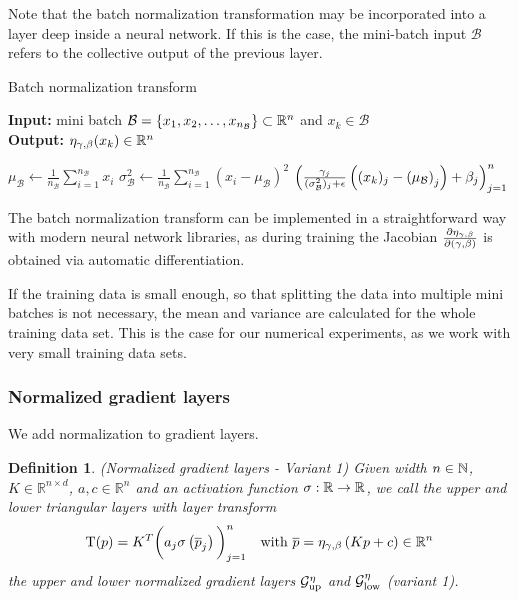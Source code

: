 \documentclass[twoside,a4paper]{article}
\newtheorem{definition}{Definition}
\begin{document}
Note that the batch normalization transformation may be incorporated into a layer
deep inside a neural network. If this is the case, the mini-batch input $\mathcal{B}$ 
refers to the collective output of the previous layer.

\begin{algorithm}\label{algo_batch_norm}
	\caption{Batch normalization transform}
	\textbf{Input:} mini batch $\mathcal{B} = \{x_1, x_2, \dots, x_{n_\mathcal{B}}\} \subset \mathbb{R}^n$ 
	and $x_k \in \mathcal{B}$ \\
	\textbf{Output:} $\eta_{\gamma, \beta}(x_k) \in \mathbb{R}^n$
	\begin{algorithmic}
		 
			\State $\mu_\mathcal{B} \gets \frac{1}{n_\mathcal{B}} \sum_{i=1}^{n_\mathcal{B}} x_i$
			\State $\sigma^2_\mathcal{B} \gets \frac{1}{n_\mathcal{B}} \sum_{i=1}^{n_\mathcal{B}} 
			(x_i - \mu_\mathcal{B})^2$
		\EndIf
		\State \Return 
		$\left( \frac{\gamma_j}{(\sigma^2_\mathcal{B})_j + \epsilon} 
		\left( (x_k)_j - \left( \mu_\mathcal{B} \right)_j \right) + \beta_j \right)_{j=1}^n$
	\end{algorithmic}
\end{algorithm}

The batch normalization transform can be implemented in a straightforward way with modern
neural network libraries, as during training the Jacobian $\frac{\partial \eta_{\gamma, \beta}}{\partial (\gamma, \beta)}$ 
is obtained via automatic differentiation.

If the training data is small enough, so that splitting the data into multiple mini batches
is not necessary, the mean and variance are calculated for the whole training data set. This is the
case for our numerical experiments, as we work with very small training data sets.

\subsubsection{Normalized gradient layers}

We add normalization to gradient layers.

\begin{definition}
	(Normalized gradient layers - Variant 1)
	Given width $n \in \mathbb{N}$, $K \in \mathbb{R}^{n \times d}$, $a,c \in \mathbb{R}^n$ and
	an activation function $\sigma : \mathbb{R} \to \mathbb{R}$,
	we call the upper and lower triangular layers with layer transform
	\begin{equation*}
		\mathrm{T}(p) = K^T \bigg( a_j \sigma
		\left( \overline{p}_j \right) \bigg)_{j=1}^n
		\quad \text{with } \overline{p} = \eta_{\gamma, \beta} \left( Kp + c \right) \in \mathbb{R}^n
	\end{equation*}
	the upper and lower normalized gradient layers 
	$\mathcal{G}_{\text{up}}^{\eta}$ and $\mathcal{G}_{\text{low}}^{\eta}$ (variant 1).
\end{definition}
\end{document}
